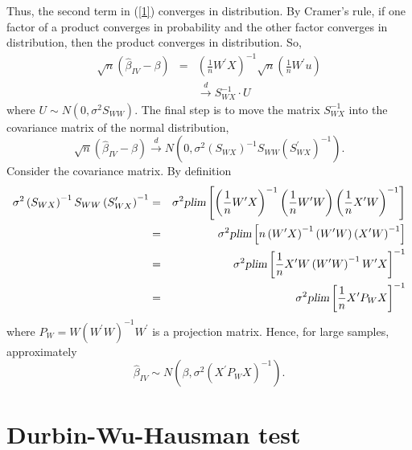 \documentclass{article}
\begin{document}
Thus, the second term in (\ref{1}) converges in distribution. By Cramer's
rule, if one factor of a product converges in probability and the other
factor converges in distribution, then the product converges in
distribution. So,%
\begin{eqnarray*}
\sqrt{n}\left( \hat{\beta}_{IV}-\beta \right) &=&\left( \frac{1}{n}W^{\prime
}X\right) ^{-1}\sqrt{n}\left( \frac{1}{n}W^{\prime }u\right) \\
&&\overset{d}{\rightarrow }S_{WX}^{-1}\cdot U
\end{eqnarray*}%
where $U\sim N\left( 0,\sigma ^{2}S_{WW}\right) .$ The final step is to move
the matrix $S_{WX}^{-1}$ into the covariance matrix of the normal
distribution,%
\begin{equation*}
\sqrt{n}\left( \hat{\beta}_{IV}-\beta \right) \overset{d}{\rightarrow }%
N\left( 0,\sigma ^{2}\left( S_{WX}\right) ^{-1}S_{WW}\left( S_{WX}^{\prime
}\right) ^{-1}\right) .
\end{equation*}%
Consider the covariance matrix. By definition
\begin{eqnarray*}
\sigma ^{2}\left( S_{WX}\right) ^{-1}S_{WW}\left( S_{WX}^{\prime }\right)
^{-1} &=&\sigma ^{2}\textsl{plim}\left[ \left( \frac{1}{n}W^{\prime
}X\right) ^{-1}\left( \frac{1}{n}W^{\prime }W\right) \left( \frac{1}{n}%
X^{\prime }W\right) ^{-1}\right] \\
&=&\sigma ^{2}\textsl{plim}\left[ n\left( W^{\prime }X\right) ^{-1}\left(
W^{\prime }W\right) \left( X^{\prime }W\right) ^{-1}\right] \\
&=&\sigma ^{2}\textsl{plim}\left[ \frac{1}{n}X^{\prime }W\left( W^{\prime
}W\right) ^{-1}W^{\prime }X\right] ^{-1} \\
&=&\sigma ^{2}\textsl{plim}\left[ \frac{1}{n}X^{\prime }P_{W}X\right] ^{-1}
\end{eqnarray*}%
where $P_{W}=W\left( W^{\prime }W\right) ^{-1}W^{\prime }$ is a projection
matrix. Hence, for large samples, approximately%
\begin{equation*}
\hat{\beta}_{IV}\sim N\left( \beta ,\sigma ^{2}\left( X^{\prime
}P_{W}X\right) ^{-1}\right) .
\end{equation*}

\section{Durbin-Wu-Hausman test}
\end{document}
